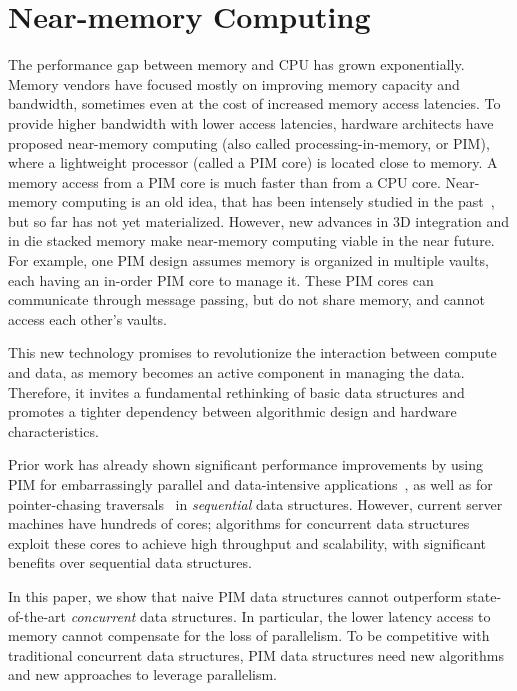\section{Near-memory Computing}

The performance gap between memory and CPU has grown exponentially. Memory vendors have focused mostly on improving memory capacity and bandwidth, sometimes even at the cost of increased memory access latencies. To provide higher bandwidth with lower access latencies, hardware architects have proposed near-memory computing (also called processing-in-memory, or PIM), where a lightweight processor (called a PIM core) is located close to memory. A memory access from a PIM core is much faster than from a CPU core. 
Near-memory computing is an old idea, that has been intensely studied in the past~\cite{}, but so far has not yet materialized. However, new advances in 3D integration and in die stacked memory make near-memory computing viable in the near future. 
For example, one PIM design assumes memory is organized in multiple vaults, each having an in-order PIM core to manage it. These PIM cores
can communicate through message passing, but do not share memory, and cannot access each other's vaults. 

This new technology promises to revolutionize the interaction between compute and data, as memory becomes an active component in managing the data. Therefore, it invites a fundamental rethinking of basic data structures and promotes a tighter dependency between algorithmic design and hardware characteristics. 

Prior work has already shown significant performance improvements by using PIM for 
embarrassingly parallel and data-intensive applications~\cite{}, as well as for
pointer-chasing traversals~\cite{} in \emph{sequential} data structures. 
However, current server machines have hundreds of cores; algorithms for 
concurrent data structures exploit these cores to achieve high throughput and 
scalability, with significant benefits over sequential data structures. 

In this paper, we show that
  naive PIM data structures cannot outperform 
 state-of-the-art \emph{concurrent} data structures. In particular, 
the lower latency access to memory cannot compensate for the loss of 
parallelism. To be competitive with traditional concurrent data structures, 
PIM data structures need new algorithms and new approaches to leverage parallelism.  

